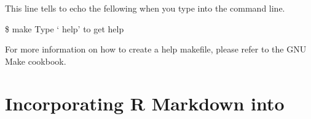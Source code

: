 This line tells \maken{} to echo the fellowing when you type \maken{} into the command line.
\begin{bash}
\$ make
Type `\maken{} help' to get help
\end{bash}




For more information on how to create a help makefile, please refer to the GNU Make cookbook. 

\section{Incorporating R Markdown into \maken{}}



